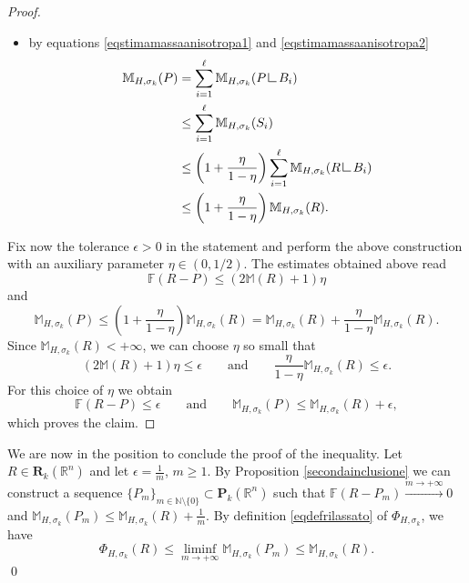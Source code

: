 \documentclass{article}
\numberwithin{equation}{section}
\theoremstyle{plain}%
\theoremstyle{definition}
\theoremstyle{definition}
\newcommand{\rgrande}{\mathbb{R}}
\newcommand{\ngrande}{\mathbb{N}}
\newcommand{\corrett}{\mathbf{R}_k(\rgrande^n)}
\newcommand{\corrpol}{\mathbf{P}_k(\rgrande^n)}
\newcommand{\normaflat}{\mathbb{F}}
\newcommand{\massa}{\mathbb{M}}
\newcommand{\massaanisotropa}{\mathbb{M}_{H,\sigma_k}}
\newcommand{\rilassato}{\Phi_{H, \sigma_k}}
\newcommand{\mrestr}{\mathop{\hbox{\vrule height 7pt width 0.5pt depth 0pt
\vrule height 0.5pt width 6pt depth 0pt}}\nolimits}
\newcommand{\indice}{\ell}
\begin{document}
\begin{proof}
\begin{itemize}
\begin{equation*}
\begin{split}
                    \leq
                    2 \eta \massa(R) + \eta
                    \text{;}
                \end{split}
            \end{equation*}
        \item by equations \eqref{eqstimamassaanisotropa1} and \eqref{eqstimamassaanisotropa2}
        \begin{equation*}
            \begin{split}
                \massaanisotropa (P) &
                = \sum_{i=1}^{\indice} \massaanisotropa (P \mrestr B_i) \\
                &
                \leq
                \sum_{i=1}^{\indice} \massaanisotropa (S_i) \\
                &
                \leq
                \left( 1 + \frac{\eta}{1- \eta} \right)\sum_{i=1}^{\indice}
                \massaanisotropa(R \mrestr B_i ) \\
                &
                \leq
                \left( 1 + \frac{\eta}{1- \eta} \right) \massaanisotropa (R)
                 \text{.}
            \end{split}
        \end{equation*}
    \end{itemize}
Fix now the tolerance $\epsilon>0$ in the statement and perform the above construction with an auxiliary parameter $\eta\in (0,1/2)$. The estimates obtained above read
$$
\normaflat(R-P)\le (2\massa(R)+1)\eta
$$
and
$$
\massaanisotropa(P)\le \left(1+\frac{\eta}{1-\eta}\right)\massaanisotropa(R)
= \massaanisotropa(R)+\frac{\eta}{1-\eta}\massaanisotropa(R).
$$
Since $\massaanisotropa(R)<+\infty$, we can choose $\eta$ so small that
$$
(2\massa(R)+1)\eta\le \epsilon
\qquad\text{and}\qquad
\frac{\eta}{1-\eta}\massaanisotropa(R)\le \epsilon.
$$
For this choice of $\eta$ we obtain
$$
\normaflat(R-P)\le \epsilon
\qquad\text{and}\qquad
\massaanisotropa(P)\le \massaanisotropa(R)+\epsilon,
$$
which proves the claim.
\end{proof}

We are now in the position to conclude the proof of the inequality. Let $R \in \corrett$ and let $\epsilon = \frac{1}{m}$, $m \geq 1$. By Proposition \ref{secondainclusione} we can construct a sequence $\{P_m \}_{m \in \ngrande \setminus \{ 0 \}} \subset \corrpol$ such that $\normaflat(R - P_m) \xrightarrow[]{m \to + \infty} 0$ and $\massaanisotropa (P_m) \leq \massaanisotropa (R) + \frac{1}{m}$. By definition \eqref{eqdefrilassato} of $\rilassato$, we have
$$
\rilassato(R) \leq \liminf_{m \to + \infty} \massaanisotropa(P_m) \leq \massaanisotropa (R)
\text{.}
$$
\qed
\end{document}

